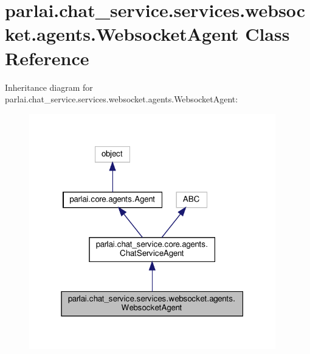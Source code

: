 \hypertarget{classparlai_1_1chat__service_1_1services_1_1websocket_1_1agents_1_1WebsocketAgent}{}\section{parlai.\+chat\+\_\+service.\+services.\+websocket.\+agents.\+Websocket\+Agent Class Reference}
\label{classparlai_1_1chat__service_1_1services_1_1websocket_1_1agents_1_1WebsocketAgent}


Inheritance diagram for parlai.\+chat\+\_\+service.\+services.\+websocket.\+agents.\+Websocket\+Agent\+:
\nopagebreak
\begin{figure}[H]
\begin{center}
\leavevmode
\includegraphics[width=304pt]{classparlai_1_1chat__service_1_1services_1_1websocket_1_1agents_1_1WebsocketAgent__inherit__graph}
\end{center}
\end{figure}


